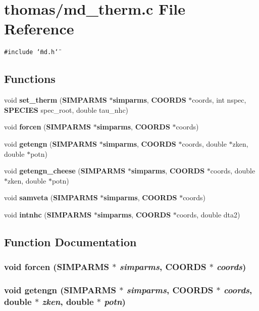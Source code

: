 \section{thomas/md\_\-therm.c File Reference}
\label{thomas_2md__therm_8c}
{\tt \#include \char`\"{}md.h\char`\"{}}\par
\subsection*{Functions}
\begin{CompactItemize}
\item 
void {\bf set\_\-therm} ({\bf SIMPARMS} $\ast${\bf simparms}, {\bf COORDS} $\ast$coords, int nspec, {\bf SPECIES} spec\_\-root, double tau\_\-nhc)
\item 
void {\bf forcen} ({\bf SIMPARMS} $\ast${\bf simparms}, {\bf COORDS} $\ast$coords)
\item 
void {\bf getengn} ({\bf SIMPARMS} $\ast${\bf simparms}, {\bf COORDS} $\ast$coords, double $\ast$zken, double $\ast$potn)
\item 
void {\bf getengn\_\-cheese} ({\bf SIMPARMS} $\ast${\bf simparms}, {\bf COORDS} $\ast$coords, double $\ast$zken, double $\ast$potn)
\item 
void {\bf samveta} ({\bf SIMPARMS} $\ast${\bf simparms}, {\bf COORDS} $\ast$coords)
\item 
void {\bf intnhc} ({\bf SIMPARMS} $\ast${\bf simparms}, {\bf COORDS} $\ast$coords, double dta2)
\end{CompactItemize}


\subsection{Function Documentation}
\subsubsection{\setlength{\rightskip}{0pt plus 5cm}void forcen ({\bf SIMPARMS} $\ast$ {\em simparms}, {\bf COORDS} $\ast$ {\em coords})}\label{thomas_2md__therm_8c_18a1f8a3dcdc66a98c963a13b15e914c}


\subsubsection{\setlength{\rightskip}{0pt plus 5cm}void getengn ({\bf SIMPARMS} $\ast$ {\em simparms}, {\bf COORDS} $\ast$ {\em coords}, double $\ast$ {\em zken}, double $\ast$ {\em potn})}\label{thomas_2md__therm_8c_da3502d7621392f01626bc894cac8368}


